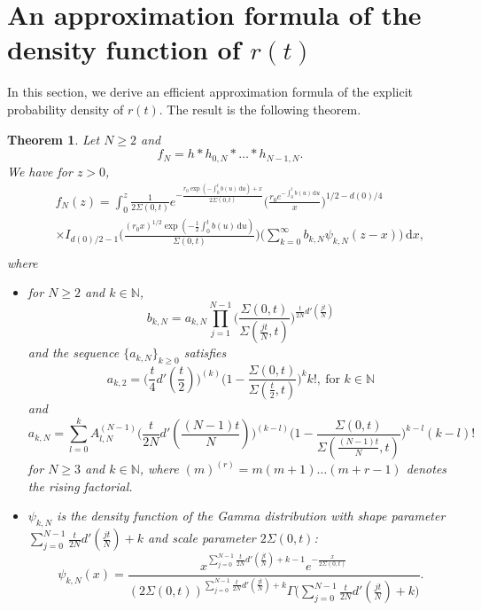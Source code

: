 \documentclass[6pt]{article}
\def\ud{\, \mathrm{d}}
\newtheorem{theorem}{Theorem}[section]
\numberwithin{equation}{section}
\begin{document}
\section{An approximation formula of the density function of $r(t)$}
In this section, we derive an efficient approximation formula of the explicit probability density of $r(t)$. The result is the following theorem.
 \begin{theorem}
 \label{exdensity}
 Let $N\ge2$ and
 \begin{equation}
 \label{exfN}
 f_N=h*h_{0,N}*\ldots*h_{N-1,N}.
 \end{equation}
We have for $z>0$,
 \begin{eqnarray}
 \label{exfN1}
&&f_N(z)=\int_{0}^z\frac{1}{2\Sigma(0,t)}e^{-\frac{r_0\exp(-\int_0^tb(u)\ud u)+x}{2\Sigma(0,t)}}\Big(\frac{r_0e^{-\int_0^tb(u)\ud u}}{x}\Big)^{1/2-d(0)/4}\nonumber\\
&&\times I_{d(0)/2-1}\Big(\frac{(r_0x)^{1/2}\exp(-\frac{1}{2}\int_0^tb(u)\ud u)}{\Sigma(0,t)}\Big)\Big(\sum_{k=0}^{\infty}b_{k,N}\psi_{k,N}(z-x)\Big)\ud x,\nonumber\\
\end{eqnarray}
where
\begin{itemize}
\item for $N\ge2$ and $k\in\mathbb N$,
$$
b_{k,N}=a_{k,N}\prod_{j=1}^{N-1}\big(\frac{\Sigma(0,t)}{\Sigma(\frac{jt}{N},t)}\big)^{\frac{t}{2N}d'(\frac{jt}{N})}
$$
and the sequence $\{a_{k,N}\}_{k\ge0}$ satisfies
$$
a_{k,2}=\Big(\frac{t}{4}d'(\frac{t}{2})\Big)^{(k)}\Big(1-\frac{\Sigma(0,t)}{\Sigma(\frac{t}{2},t)}\Big)^kk!,~\mbox{for $k\in\mathbb N$}
$$
and
$$
a_{k,N}=\sum\limits_{l=0}^kA_{l,N}^{(N-1)}\Big(\frac{t}{2N}d'(\frac{(N-1)t}{N})\Big)^{(k-l)}\Big(1-\frac{\Sigma(0,t)}{\Sigma(\frac{(N-1)t}{N},t)}\Big)^{k-l}(k-l)!
$$
for $N\ge3$ and $k\in\mathbb N$, where $(m)^{(r)}=m(m+1)\ldots(m+r-1)$ denotes the rising factorial.
\item $\psi_{k,N}$ is the density function of the Gamma distribution with shape parameter $\sum_{j=0}^{N-1}\frac{t}{2N}d'(\frac{jt}{N})+k$ and scale parameter $2\Sigma(0,t)$:
\begin{equation}
\label{psi}
\psi_{k,N}(x)=\frac{x^{\sum_{j=0}^{N-1}\frac{t}{2N}d'(\frac{jt}{N})+k-1}e^{-\frac{x}{2\Sigma(0,t)}}}{(2\Sigma(0,t))^{\sum_{j=0}^{N-1}\frac{t}{2N}d'(\frac{jt}{N})+k}\Gamma\big(\sum_{j=0}^{N-1}\frac{t}{2N}d'(\frac{jt}{N})+k\big)}.
\end{equation}
\end{itemize}
 \end{theorem}
\end{document}
